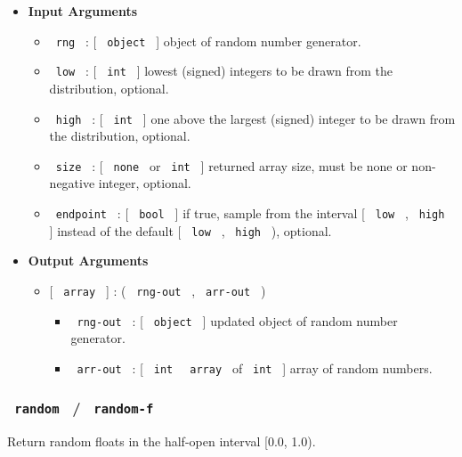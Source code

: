 \begin{itemize}
\item
  \textbf{Input Arguments}

  \begin{itemize}
  \tightlist
  \item
    \texttt{\ rng\ } : {[} \texttt{\ object\ } {]} object of random
    number generator.
  \item
    \texttt{\ low\ } : {[} \texttt{\ int\ } {]} lowest (signed) integers
    to be drawn from the distribution, optional.
  \item
    \texttt{\ high\ } : {[} \texttt{\ int\ } {]} one above the largest
    (signed) integer to be drawn from the distribution, optional.
  \item
    \texttt{\ size\ } : {[} \texttt{\ none\ } or \texttt{\ int\ } {]}
    returned array size, must be none or non-negative integer, optional.
  \item
    \texttt{\ endpoint\ } : {[} \texttt{\ bool\ } {]} if true, sample
    from the interval {[} \texttt{\ low\ } , \texttt{\ high\ } {]}
    instead of the default {[} \texttt{\ low\ } , \texttt{\ high\ } ),
    optional.
  \end{itemize}
\item
  \textbf{Output Arguments}

  \begin{itemize}
  \tightlist
  \item
    {[} \texttt{\ array\ } {]} : ( \texttt{\ rng-out\ } ,
    \texttt{\ arr-out\ } )

    \begin{itemize}
    \tightlist
    \item
      \texttt{\ rng-out\ } : {[} \texttt{\ object\ } {]} updated object
      of random number generator.
    \item
      \texttt{\ arr-out\ } : {[} \texttt{\ int\ } \textbar{}
      \texttt{\ array\ } of \texttt{\ int\ } {]} array of random
      numbers.
    \end{itemize}
  \end{itemize}
\end{itemize}

\subsubsection{\texorpdfstring{\texttt{\ random\ } /
\texttt{\ random-f\ }}{ random  /  random-f }}\label{random-random-f}

Return random floats in the half-open interval {[}0.0, 1.0).

